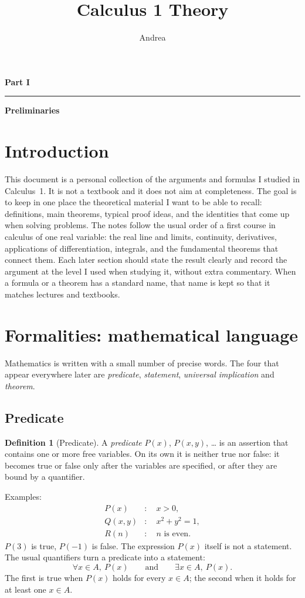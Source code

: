 \documentclass[11pt,a4paper]{article}
\title{Calculus 1 Theory} \author{Andrea} \date{}
\theoremstyle{definition} \newtheorem{definition}{Definition} \theoremstyle{plain} \newtheorem{theorem}{Theorem}
\newcommand{\partpage}[2]{%
  \clearpage
  \thispagestyle{plain}%
  \phantomsection
  \addcontentsline{toc}{part}{Part #1 --- #2}%
  \null\vfill
  \begin{center}
    {\sffamily\Huge\bfseries Part #1\par}
    \vspace{4ex}
    \rule{0.55\textwidth}{1pt}\par
    \vspace{4ex}
    {\sffamily\LARGE\bfseries #2\par}
  \end{center}
  \vfill
}
\begin{document}
 \maketitle
\tableofcontents
\partpage{I}{Preliminaries}
\clearpage
\section*{Introduction}
This document is a personal collection of the arguments and formulas I studied in Calculus~1. It is not a textbook and it does not aim at completeness. The goal is to keep in one place the theoretical material I want to be able to recall: definitions, main theorems, typical proof ideas, and the identities that come up when solving problems.
The notes follow the usual order of a first course in calculus of one real variable: the real line and limits, continuity, derivatives, applications of differentiation, integrals, and the fundamental theorems that connect them. Each later section should state the result clearly and record the argument at the level I used when studying it, without extra commentary.
When a formula or a theorem has a standard name, that name is kept so that it matches lectures and textbooks.
\clearpage
\section{Formalities: mathematical language}\label{sec:formalities}
Mathematics is written with a small number of precise words. The four that appear everywhere later are \emph{predicate}, \emph{statement}, \emph{universal implication} and \emph{theorem}.
\subsection{Predicate}
\begin{definition}[Predicate] A \emph{predicate} $P(x)$, $P(x,y)$, \ldots{} is an assertion that contains one or more free variables. On its own it is neither true nor false: it becomes true or false only after the variables are specified, or after they are bound by a quantifier. \end{definition}
Examples: \begin{align*} P(x) &\colon\quad x>0, \\ Q(x,y) &\colon\quad x^2+y^2=1, \\ R(n) &\colon\quad n\text{ is even}. \end{align*} $P(3)$ is true, $P(-1)$ is false. The expression $P(x)$ itself is not a statement.
The usual quantifiers turn a predicate into a statement:
\[\boxed{ \forall x\in A,\ P(x) \qquad\text{and}\qquad \exists x\in A,\ P(x). }\]
The first is true when $P(x)$ holds for every $x\in A$; the second when it holds for at least one $x\in A$.
\end{document}
